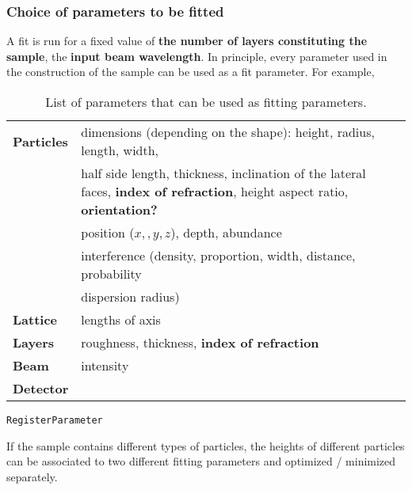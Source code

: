 \subsubsection{Choice of parameters to be fitted}
A fit is run for a fixed value of \textbf{the number of layers
  constituting the sample}, the \textbf{input beam wavelength}. In principle, every parameter used in the construction of the sample
can be used as a fit parameter. For example,

\begin{table}[h]
\centering
\begin{tabular}{|@{}l||l@{}|}
\hline
\textbf{Particles} &  dimensions (depending on the shape): height, radius, length, width, \\
                             &  half side length, thickness,
                             inclination of the lateral faces,
                             \textbf{index of refraction}, height
                             aspect ratio, \textbf{orientation?}\\
& position ($x, ,y, z$), depth, abundance \\
& interference (density, proportion, width, distance, probability\\
& dispersion radius) \\
\hline
\textbf{Lattice} & lengths of axis\\
\hline
\textbf{Layers} & roughness, thickness, \textbf{index of refraction} \\
\hline
\textbf{Beam} & intensity \\
\hline
\textbf{Detector} & \\
\hline
\end{tabular}
\label{table:fitting_parameters}
\caption{List of parameters that can be used as fitting parameters.}
\end{table}

\texttt{RegisterParameter}



If the sample contains different types of particles, the heights of different particles can be associated to two different
fitting parameters and optimized / minimized separately.\\


